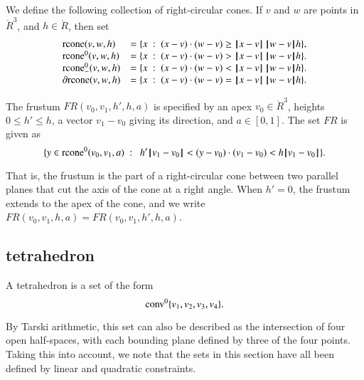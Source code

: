 \begin{definition}[rcone]
We define the following collection of right-circular cones.
If $v$ and $w$ are points in $\ring{R}^3$, and
  $h\in\ring{R}$, then set
  $$\begin{array}{lll}
    \op{rcone}(v,w,h) &= \{x\mid (x-v)\cdot (w-v) \ge \norm{x}{v}\,\norm{w}{v} h\},\\
    \op{rcone}^0(v,w,h) &= \{x\mid (x-v)\cdot (w-v) > \norm{x}{v}\,\norm{w}{v} h\}.\\
    \op{rcone}_-^0(v,w,h) &= \{x\mid (x-v)\cdot (w-v) < \norm{x}{v}\,\norm{w}{v} h\}.\\
    \partial\op{rcone}(v,w,h) &= \{x\mid (x-v)\cdot (w-v) = \norm{x}{v}\,\norm{w}{v} h\}.\\
    \end{array}
    $$
\end{definition}



\begin{definition}[frustum, FR] The frustum
$FR(v_0,v_1,h',h,a)$ is specified by an apex $v_0\in\ring{R}^3$, heights
$0\le h'\le h$, a vector $v_1-v_0$ giving its direction, and
$a\in[0,1]$. The set $FR$ is given as
    $$
    \{ y \in\op{rcone}^0(v_0,v_1,a) \mid \ 
       h'\norm{v_1}{v_0} < (y-v_0) \cdot (v_1-v_0) < h\norm{v_1}{v_0} \}.
    $$
\end{definition}

That is, the frustum is the part of a right-circular cone between two
parallel planes that cut the axis of the cone at a right angle.
When $h'=0$, the frustum extends to the apex of the cone, and
we write $FR(v_0,v_1,h,a)=FR(v_0,v_1,h',h,a)$.

\subsection{tetrahedron}

\begin{definition}[tetrahedron] A tetrahedron is a set of the form
$${\operatorname{conv}}^0\{v_1,v_2,v_3,v_4\}.$$
\end{definition}

By Tarski arithmetic, %
this set can also be described
as the intersection of four open half-spaces, with each bounding
plane defined by three of the four points.
Taking this into account, we note that
the sets in this section have all been defined by linear and quadratic
constraints.

